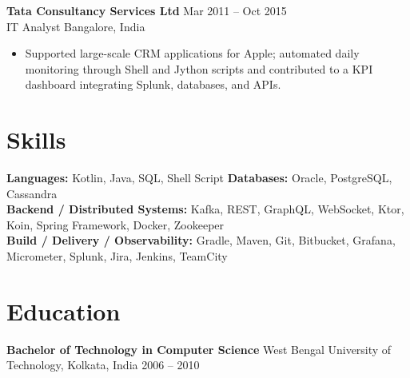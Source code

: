 \documentclass[a4paper,9pt]{article}
\begin{document}
\textbf{Tata Consultancy Services Ltd} \hfill Mar 2011 -- Oct 2015\\
{\color{navy}IT Analyst} \hfill Bangalore, India \vspace{-5pt}\\
\begin{itemize}[left=0pt, label=\textbullet, itemsep=0pt, parsep=0pt, topsep=0pt, partopsep=0pt]
    \item Supported large-scale CRM applications for Apple; automated daily monitoring through Shell and Jython scripts and contributed to a KPI dashboard integrating Splunk, databases, and APIs.
\end{itemize}
\vspace{2pt}

\section*{Skills}

\noindent\textbf{Languages:} Kotlin, Java, SQL, Shell Script \quad\textbf{Databases:} Oracle, PostgreSQL, Cassandra \\
\noindent\textbf{Backend / Distributed Systems:} Kafka, REST, GraphQL, WebSocket, Ktor, Koin, Spring Framework, Docker, Zookeeper \\
\noindent\textbf{Build / Delivery / Observability:} Gradle, Maven, Git, Bitbucket, Grafana, Micrometer, Splunk, Jira, Jenkins, TeamCity

\section*{Education}

\noindent\textbf{Bachelor of Technology in Computer Science} \hfill West Bengal University of Technology, Kolkata, India \hfill 2006 -- 2010
\end{document}

